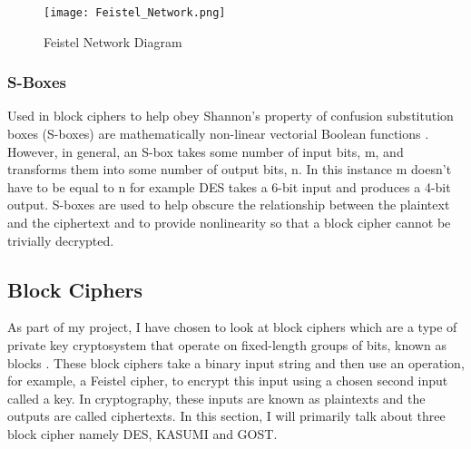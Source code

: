 \documentclass{article}
\begin{document}
\begin{figure}[hbt!]
    \centering
    \texttt{[image: Feistel\_Network.png]}
    \caption{Feistel Network Diagram}
    \label{fig:enter-label}
\end{figure}
 

\subsubsection{S-Boxes}
Used in block ciphers to help obey Shannon’s property of confusion substitution boxes (S-boxes) are mathematically non-linear vectorial Boolean functions \cite{wiki:S-box}. However, in general, an S-box takes some number of input bits, m, and transforms them into some number of output bits, n. In this instance m doesn’t have to be equal to n for example DES takes a 6-bit input and produces a 4-bit output. S-boxes are used to help obscure the relationship between the plaintext and the ciphertext and to provide nonlinearity so that a block cipher cannot be trivially decrypted.
\subsection{Block Ciphers}
As part of my project, I have chosen to look at block ciphers which are a type of private key cryptosystem that operate on fixed-length groups of bits, known as blocks \cite{wiki:Block_cipher}. These block ciphers take a binary input string and then use an operation, for example, a Feistel cipher, to encrypt this input using a chosen second input called a key. In cryptography, these inputs are known as plaintexts and the outputs are called ciphertexts. In this section, I will primarily talk about three block cipher namely DES, KASUMI and GOST.
\end{document}

